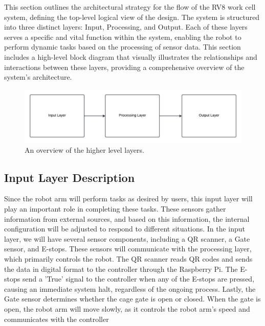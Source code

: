 This section outlines the architectural strategy for the flow of the RV8 work cell system, defining the top-level logical view of the design. The system is structured into three distinct layers: Input, Processing, and Output. Each of these layers serves a specific and vital function within the system, enabling the robot to perform dynamic tasks based on the processing of sensor data. This section includes a high-level block diagram that visually illustrates the relationships and interactions between these layers, providing a comprehensive overview of the system's architecture.

\begin{figure}[h!]
	\centering
 	\includegraphics[width=1\textwidth]{images/sys_overview.png}
 \caption{An overview of the higher level layers.}
\end{figure}

\subsection{Input Layer Description}
Since the robot arm will perform tasks as desired by users, this input layer will play an important role in completing these tasks. These sensors gather information from external sources, and based on this information, the internal configuration will be adjusted to respond to different situations. In the input layer, we will have several sensor components, including a QR scanner, a Gate sensor, and E-stops. These sensors will communicate with the processing layer, which primarily controls the robot. The QR scanner reads QR codes and sends the data in digital format to the controller through the Raspberry Pi. The E-stops send a 'True' signal to the controller when any of the E-stops are pressed, causing an immediate system halt, regardless of the ongoing process. Lastly, the Gate sensor determines whether the cage gate is open or closed. When the gate is open, the robot arm will move slowly, as it controls the robot arm's speed and communicates with the controller

